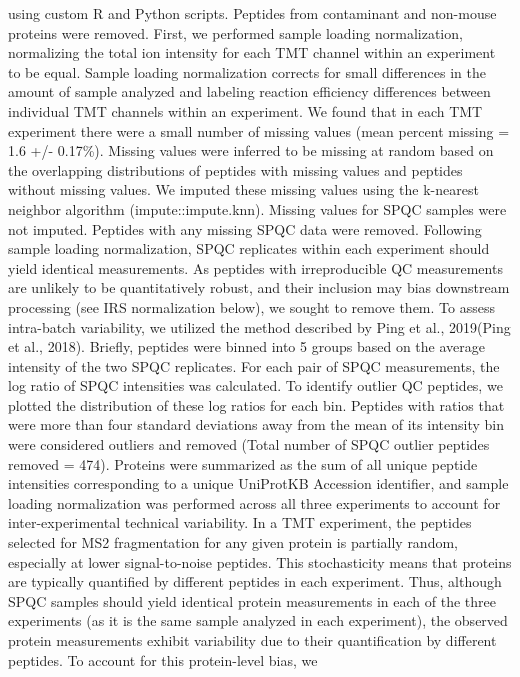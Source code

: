 using custom R and Python scripts. Peptides from contaminant and non-mouse
proteins were removed. First, we performed sample loading normalization,
normalizing the total ion intensity for each TMT channel within an experiment to
be equal. Sample loading normalization corrects for small differences in the
amount of sample analyzed and labeling reaction efficiency differences between
individual TMT channels within an experiment. 
We found that in each TMT experiment there were a small number of missing values
(mean percent missing = 1.6 +/- 0.17\%). Missing values were inferred to be
missing at random based on the overlapping distributions of peptides with
missing values and peptides without missing values. We imputed these missing
values using the k-nearest neighbor algorithm (impute::impute.knn). Missing
values for SPQC samples were not imputed. Peptides with any missing SPQC data
were removed. 
Following sample loading normalization, SPQC replicates within each experiment
should yield identical measurements. As peptides with irreproducible QC
measurements are unlikely to be quantitatively robust, and their inclusion may
bias downstream processing (see IRS normalization below), we sought to remove
them. To assess intra-batch variability, we utilized the method described by
Ping et al., 2019(Ping et al., 2018). Briefly, peptides were binned into 5
groups based on the average intensity of the two SPQC replicates. For each pair
of SPQC measurements, the log ratio of SPQC intensities was calculated. To
identify outlier QC peptides, we plotted the distribution of these log ratios
for each bin. Peptides with ratios that were more than four standard deviations
away from the mean of its intensity bin were considered outliers and removed
(Total number of SPQC outlier peptides removed = 474). 
Proteins were summarized as the sum of all unique peptide intensities
corresponding to a unique UniProtKB Accession identifier, and sample loading
normalization was performed across all three experiments to account for
inter-experimental technical variability. In a TMT experiment, the peptides
selected for MS2 fragmentation for any given protein is partially random,
especially at lower signal-to-noise peptides. This stochasticity means that
proteins are typically quantified by different peptides in each experiment.
Thus, although SPQC samples should yield identical protein measurements in each
of the three experiments (as it is the same sample analyzed in each experiment),
the observed protein measurements exhibit variability due to their
quantification by different peptides. To account for this protein-level bias, we
